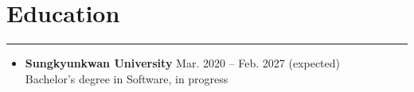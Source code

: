 \documentclass[letterpaper,10pt]{article}
\begin{document}
\section*{Education}
\hrule
\vspace{4pt}
\begin{itemize}
\item \textbf{Sungkyunkwan University} \hfill Mar. 2020 -- Feb. 2027 (expected) \\
Bachelor's degree in Software, in progress
\end{itemize}
\end{document}
